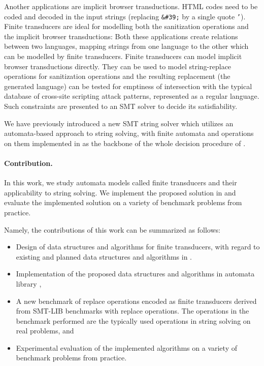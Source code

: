 Another applications are implicit browser transductions.
HTML codes need to be coded and decoded in the input strings (replacing \texttt{\&\#39;} by a single quote \texttt{'}).
Finite transducers are ideal for modelling both the sanitization operations and the implicit browser transductions:
Both these applications create relations between two languages, mapping strings from one language to the other which can be modelled by finite transducers.
Finite transducers can model implicit browser transductions directly.
They can be used to model string-replace operations for sanitization operations and the resulting replacement (the generated language) can be tested for emptiness of intersection with the typical database of cross-site scripting attack patterns, represented as a regular language.
Such constraints are presented to an SMT solver to decide its satisfiability.

We have previously introduced a new SMT string solver \noodler which utilizes an automata-based approach to string solving, with finite automata and operations on them implemented in \mata as the backbone of the whole decision procedure of \noodler.

\paragraph{Contribution.}
In this work, we study automata models called finite transducers and their applicability to string solving. We implement the proposed solution in \mata and evaluate the implemented solution on a variety of benchmark problems from practice.

Namely, the contributions of this work can be summarized as follows:
\begin{itemize}
  \item Design of data structures and algorithms for finite transducers, with regard to existing and planned data structures and algorithms in \mata.
  \item Implementation of the proposed data structures and algorithms in automata library \mata,
  \item A new benchmark of replace operations encoded as finite transducers derived from SMT-LIB benchmarks with replace operations. The operations in the benchmark performed are the typically used operations in string solving on real problems, and
  \item Experimental evaluation of the implemented algorithms on a variety of benchmark problems from practice.
\end{itemize}

